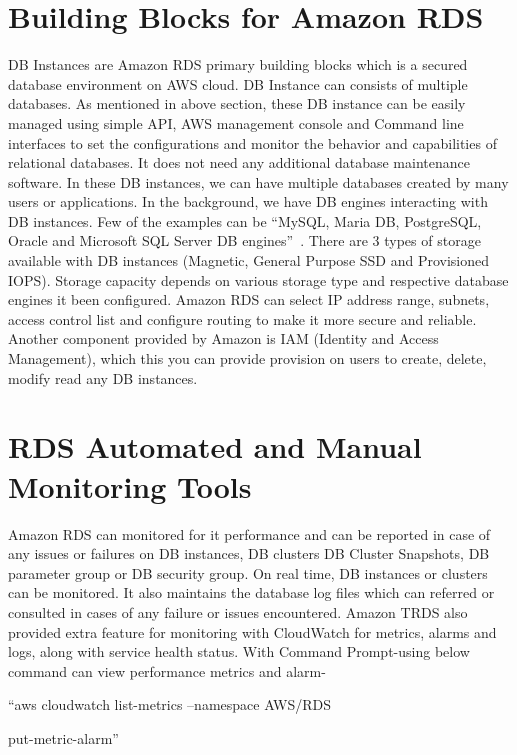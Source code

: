 \section{Building Blocks for Amazon RDS}

DB Instances are Amazon RDS primary building blocks which is a secured 
database environment on AWS cloud. DB Instance can consists of multiple 
databases. As mentioned in above section, these DB instance can 
be easily managed using simple API, AWS management console and Command line 
interfaces to set the configurations and monitor the behavior and capabilities 
of relational databases. It does not need any additional database maintenance 
software. In these DB instances, we can have multiple databases created by many
users or 
applications.
In the background, we have DB engines interacting with DB instances. Few of the
examples can be ``MySQL, Maria DB, PostgreSQL, Oracle and Microsoft SQL Server 
DB engines''~\cite{hid-sp18-520-amazonrds}.
There are 3 types of storage available with DB instances (Magnetic, General 
Purpose SSD and Provisioned IOPS).
Storage capacity depends on various storage type and respective database 
engines it been configured.
Amazon RDS can select IP address range, subnets, access control list and 
configure routing to make it more secure and reliable.
Another component provided by Amazon is IAM (Identity and Access Management), 
which this you can provide provision on users to create, delete, modify read 
any DB instances.

\section{RDS Automated and Manual Monitoring Tools}

Amazon RDS can monitored for it performance and can be reported in case of 
any issues or failures on DB instances, DB clusters DB Cluster Snapshots, DB 
parameter group or DB security group.
On real time, DB instances or clusters can be monitored. It also maintains the 
database log files which can referred or consulted in cases of any failure or 
issues encountered.  
Amazon TRDS also provided extra feature for monitoring with CloudWatch for 
metrics, alarms and logs, along with service health status. 
With Command Prompt-using below command can view performance metrics and 
alarm- 

``aws cloudwatch list-metrics --namespace AWS/RDS

put-metric-alarm''~\cite{hid-sp18-520-amardsmon}

